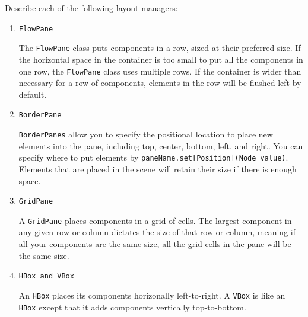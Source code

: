 Describe each of the following layout managers:
\begin{enumerate}

\item \texttt{FlowPane}
\begin{answer}
The \texttt{FlowPane} class puts components in a row, sized at their preferred size. If the horizontal space in the container is too small to put all the components in one row, the \texttt{FlowPane} class uses multiple rows. If the container is wider than necessary for a row of components, elements in the row will be flushed left by default. \end{answer}

\item \texttt{BorderPane}
\begin{answer}
\texttt{BorderPanes} allow you to specify the positional location to place new elements into the pane, including top, center, bottom, left, and right. You can specify where to put elements by \texttt{paneName.set[Position](Node value)}. Elements that are placed in the scene will retain their size if there is enough space.\end{answer}

\item \texttt{GridPane}
\begin{answer}
A \texttt{GridPane} places components in a grid of cells. The largest component in any given row or column dictates the size of that row or column, meaning if all your components are the same size, all the grid cells in the pane will be the same size.\end{answer} 

\item \texttt{HBox and VBox}
\begin{answer}
An \texttt{HBox} places its components horizonally left-to-right.
A \texttt{VBox} is like an \texttt{HBox} except that it adds components vertically top-to-bottom.
\end{answer}

\end{enumerate}

\vspace{24pt}
